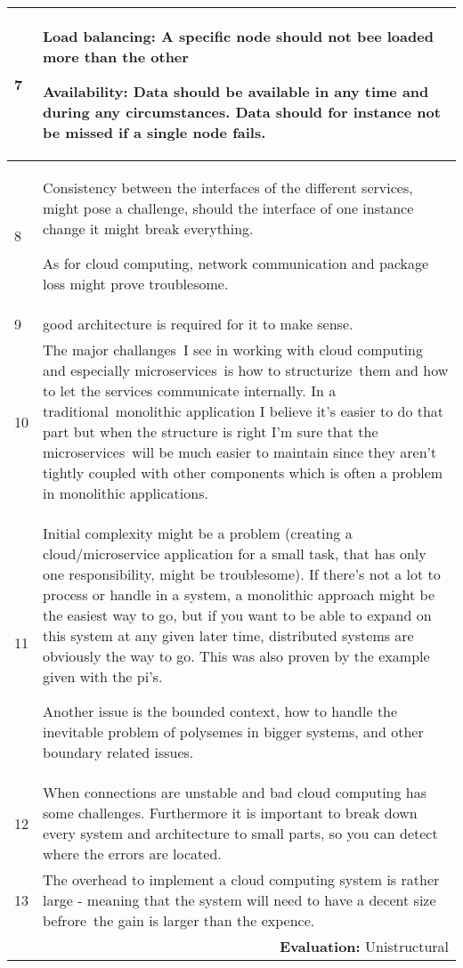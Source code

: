 \begin{longtable}{|p{0.3cm}|p{14.7cm}|}
7 & Load balancing: A specific node should not bee loaded more than the other

\noindent Availability: Data should be available in any time and during any circumstances. Data should for instance not be missed if a single node fails. \\ \hline

8 & Consistency between the interfaces of the different services, might pose a challenge, should the interface of one instance change it might break everything.

\noindent As for cloud computing, network communication and package loss might prove troublesome.\\ \hline

9 & good architecture is required for it to make sense.\\ \hline

10 & The major challanges I see in working with cloud computing and especially microservices is how to structurize them and how to let the services communicate internally. In a traditional monolithic application I believe it's easier to do that part but when the structure is right I'm sure that the microservices will be much easier to maintain since they aren't tightly coupled with other components which is often a problem in monolithic applications.\\ \hline

11 & Initial complexity might be a problem (creating a cloud/microservice application for a small task, that has only one responsibility, might be troublesome). If there's not a lot to process or handle in a system, a monolithic approach might be the easiest way to go, but if you want to be able to expand on this system at any given later time, distributed systems are obviously the way to go. This was also proven by the example given with the pi's.

\noindent Another issue is the bounded context, how to handle the inevitable problem of polysemes in bigger systems, and other boundary related issues.\\ \hline

12 & When connections are unstable and bad cloud computing has some challenges. Furthermore it is important to break down every system and architecture to small parts, so you can detect where the errors are located.\\ \hline

13 & The overhead to implement a cloud computing system is rather large - meaning that the system will need to have a decent size befrore the gain is larger than the expence. \\ \hline

\multicolumn{2}{r}{\textbf{Evaluation:} Unistructural} \\ 
\end{longtable}
\normalsize



